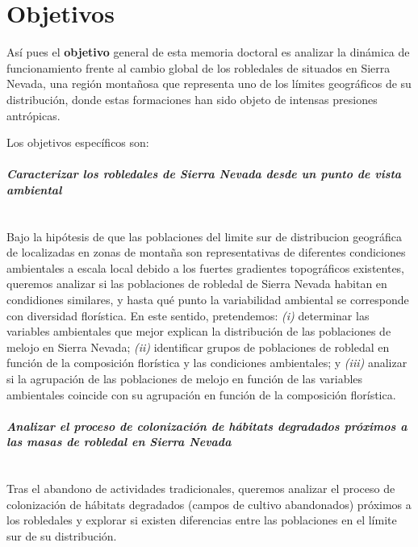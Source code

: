 \section{Objetivos}\label{sec:intro:objetivos}
Así pues el \textbf{objetivo} general de esta memoria doctoral es analizar la dinámica de funcionamiento frente al cambio global de los robledales de \Qp situados en Sierra Nevada, una región montañosa que representa uno de los límites geográficos de su distribución, donde estas formaciones han sido objeto de intensas presiones antrópicas. 

Los objetivos específicos son: 

\paragraph{\emph{Caracterizar los robledales de Sierra Nevada desde un punto de vista ambiental}}\mbox{} \\
Bajo la hipótesis de que las poblaciones del limite sur de distribucion geográfica de \Qp localizadas en zonas de montaña son representativas de diferentes condiciones ambientales a escala local debido a los fuertes gradientes topográficos existentes, queremos analizar si las poblaciones de robledal de Sierra Nevada habitan en condidiones similares, y hasta qué punto la variabilidad ambiental se corresponde con diversidad florística. En este sentido, pretendemos: \emph{(i)} determinar las variables ambientales que mejor explican la distribución de las poblaciones de melojo en Sierra Nevada; \emph{(ii)} identificar grupos de poblaciones de robledal en función de la composición florística y las condiciones ambientales; y \emph{(iii)} analizar si la agrupación de las poblaciones de melojo en función de las variables ambientales coincide con su agrupación en función de la composición florística.

\paragraph{\emph{Analizar el proceso de colonización de hábitats degradados próximos a las masas de robledal en Sierra Nevada}}\mbox{} \\
Tras el abandono de actividades tradicionales, queremos analizar el proceso de colonización de hábitats degradados (campos de cultivo abandonados) próximos a los robledales y explorar si existen diferencias entre las poblaciones en el límite sur de su distribución. 


